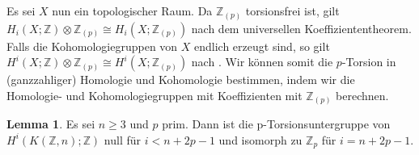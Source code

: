 \documentclass[11pt, a4paper, german]{article}
\theoremstyle{definition}
\newtheorem{lem}{Lemma}
\theoremstyle{remark}
\newcommand{\Z}{\mathbb{Z}} %
\begin{document}
Es sei $X$ nun ein topologischer Raum.
Da $\Z_{(p)}$ torsionsfrei ist, gilt
$H_i(X; \Z) \otimes \Z_{(p)} \cong H_i(X; \Z_{(p)})$ nach dem universellen Koeffiziententheorem.
Falls die Kohomologiegruppen von $X$ endlich erzeugt sind, so gilt
$H^i(X; \Z) \otimes \Z_{(p)} \cong H^i(X; \Z_{(p)})$
nach \cite[\mbox{} Thm 5.5.10]{spanier:at}.
Wir können somit die $p$-Torsion in (ganzzahliger) Homologie und Kohomologie bestimmen, indem wir die Homologie- und Kohomologiegruppen mit Koeffizienten mit $\Z_{(p)}$ berechnen.

\begin{lem}\label{mod-p-cohomology-kzn}
  Es sei $n \geq 3$ und $p$ prim.
  Dann ist die p-Torsionsuntergruppe von $H^i(K(\Z, n); \Z)$ null für $i < n + 2p - 1$ und isomorph zu $\Z_p$ für $i = n + 2p - 1$.
\end{lem}
\end{document}
